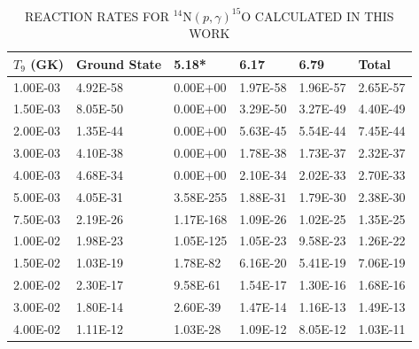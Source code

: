\begin{table}[]
\caption{REACTION RATES FOR $^{14}$N$(p,\gamma)^{15}$O CALCULATED IN THIS WORK}
\begin{center}
\begin{threeparttable}
\centering
\begin{tabular}{@{}llllll@{}}
\toprule
$T_{9}$ (GK)       & Ground State & 5.18* & 6.17 & 6.79 & Total \\ \midrule
1.00E-03 & 4.92E-58                & 0.00E+00                 & 1.97E-58                & 1.96E-57                & 2.65E-57          \\
1.50E-03 & 8.05E-50                & 0.00E+00                 & 3.29E-50                & 3.27E-49                & 4.40E-49          \\
2.00E-03 & 1.35E-44                & 0.00E+00                 & 5.63E-45                & 5.54E-44                & 7.45E-44          \\
3.00E-03 & 4.10E-38                & 0.00E+00                 & 1.78E-38                & 1.73E-37                & 2.32E-37          \\
4.00E-03 & 4.68E-34                & 0.00E+00                 & 2.10E-34                & 2.02E-33                & 2.70E-33          \\
5.00E-03 & 4.05E-31                & 3.58E-255                & 1.88E-31                & 1.79E-30                & 2.38E-30          \\
7.50E-03 & 2.19E-26                & 1.17E-168                & 1.09E-26                & 1.02E-25                & 1.35E-25          \\
1.00E-02 & 1.98E-23                & 1.05E-125                & 1.05E-23                & 9.58E-23                & 1.26E-22          \\
1.50E-02 & 1.03E-19                & 1.78E-82                 & 6.16E-20                & 5.41E-19                & 7.06E-19          \\
2.00E-02 & 2.30E-17                & 9.58E-61                 & 1.54E-17                & 1.30E-16                & 1.68E-16          \\
3.00E-02 & 1.80E-14                & 2.60E-39                 & 1.47E-14                & 1.16E-13                & 1.49E-13          \\
4.00E-02 & 1.11E-12                & 1.03E-28                 & 1.09E-12                & 8.05E-12                & 1.03E-11          \\

\end{tabular}
\end{threeparttable}
\end{center}
\end{table}

